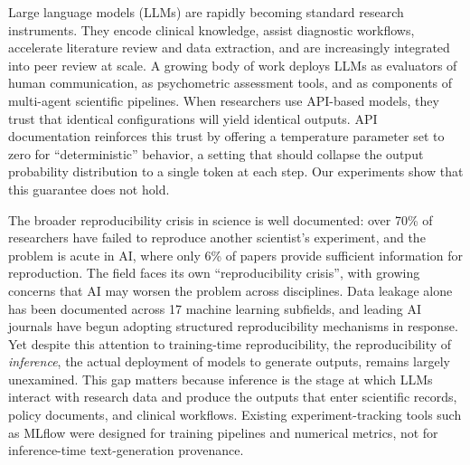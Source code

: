 \documentclass[sn-nature]{sn-jnl}
\begin{document}

\maketitle

\linenumbers


Large language models (LLMs) are rapidly becoming standard research instruments.
They encode clinical knowledge\cite{singhal2023large}, assist diagnostic workflows\cite{thirunavukarasu2023large}, accelerate literature review and data extraction\cite{birhane2023science}, and are increasingly integrated into peer review at scale\cite{thakkar2026llm}.
A growing body of work deploys LLMs as evaluators of human communication\cite{kumar2026reliable}, as psychometric assessment tools\cite{serapiogarcía2025psychometric}, and as components of multi-agent scientific pipelines\cite{xin2025agentic}.
When researchers use API-based models, they trust that identical configurations will yield identical outputs.
API documentation reinforces this trust by offering a temperature parameter set to zero for ``deterministic'' behavior, a setting that should collapse the output probability distribution to a single token at each step.
Our experiments show that this guarantee does not hold.

The broader reproducibility crisis in science is well documented: over 70\% of researchers have failed to reproduce another scientist's experiment\cite{baker2016reproducibility}, and the problem is acute in AI, where only 6\% of papers provide sufficient information for reproduction\cite{gundersen2018state}.
The field faces its own ``reproducibility crisis''\cite{hutson2018artificial}, with growing concerns that AI may worsen the problem across disciplines\cite{ball2023ai}.
Data leakage alone has been documented across 17 machine learning subfields\cite{kapoor2023leakage}, and leading AI journals have begun adopting structured reproducibility mechanisms in response\cite{gundersen2024improving}.
Yet despite this attention to training-time reproducibility, the reproducibility of \emph{inference}, the actual deployment of models to generate outputs, remains largely unexamined.
This gap matters because inference is the stage at which LLMs interact with research data and produce the outputs that enter scientific records, policy documents, and clinical workflows.
Existing experiment-tracking tools such as MLflow\cite{zaharia2018accelerating} were designed for training pipelines and numerical metrics, not for inference-time text-generation provenance.
\end{document}
